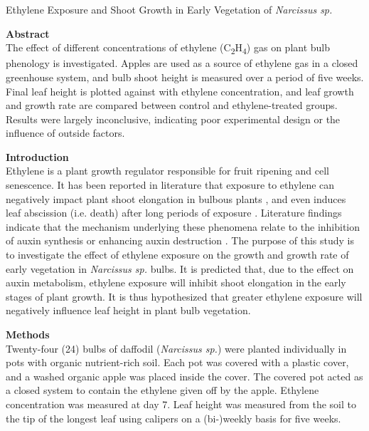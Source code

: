 \documentclass{report}
\begin{document}
\begin{center}
  \LARGE
  Ethylene Exposure and Shoot Growth in Early Vegetation of \textit{Narcissus sp.}
\end{center}

\medskip

\begin{multicols}{3}

  \textbf{Abstract}\\
  The effect of different concentrations of ethylene (C\textsubscript{2}H\textsubscript{4}) gas on plant bulb phenology is investigated.
  Apples are used as a source of ethylene gas in a closed greenhouse system, and bulb shoot height is measured over a period of five weeks.
  Final leaf height is plotted against with ethylene concentration, and leaf growth and growth rate are compared between control and ethylene-treated groups.
  Results were largely inconclusive, indicating poor experimental design or the influence of outside factors.
  
  \textbf{Introduction}\\
  Ethylene is a plant growth regulator responsible for fruit ripening and cell senescence.
  It has been reported in literature that exposure to ethylene can negatively impact plant shoot elongation in bulbous plants \parencite{bulbous}, and even induces leaf abscission (i.e. death) after long periods of exposure \parencite{abscission}.
  Literature findings indicate that the mechanism underlying these phenomena relate to the inhibition of auxin synthesis or enhancing auxin destruction \parencite{senescence}.
  The purpose of this study is to investigate the effect of ethylene exposure on the growth and growth rate of early vegetation in \textit{Narcissus sp.} bulbs.
  It is predicted that, due to the effect on auxin metabolism, ethylene exposure will inhibit shoot elongation in the early stages of plant growth.
  It is thus hypothesized that greater ethylene exposure will negatively influence leaf height in plant bulb vegetation.

  \vfill\null
  \columnbreak
  
  \textbf{Methods}\\
  Twenty-four (24) bulbs of daffodil (\textit{Narcissus sp.}) were planted individually in pots with organic nutrient-rich soil.
  Each pot was covered with a plastic cover, and a washed organic apple was placed inside the cover.
  The covered pot acted as a closed system to contain the ethylene given off by the apple.
  Ethylene concentration was measured at day 7.
  Leaf height was measured from the soil to the tip of the longest leaf using calipers on a (bi-)weekly basis for five weeks.


\end{multicols}
\end{document}

